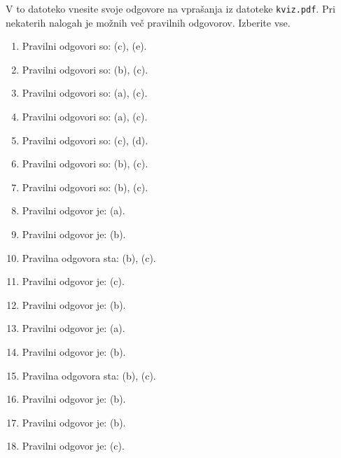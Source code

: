\documentclass[11pt]{article}
\begin{document}
V to datoteko vnesite svoje odgovore na vprašanja iz datoteke
\texttt{kviz.pdf}.
Pri nekaterih nalogah je možnih več pravilnih odgovorov.
Izberite vse.

\begin{enumerate}

    \item Pravilni odgovori so: (c), (e).

    \item Pravilni odgovori so: (b), (c).

    \item Pravilni odgovori so: (a), (c).

    \item Pravilni odgovori so: (a), (c).

    \item Pravilni odgovori so: (c), (d).

    \item Pravilni odgovori so: (b), (c).

    \item Pravilni odgovori so: (b), (c).

    \item Pravilni odgovor je: (a).

    \item Pravilni odgovor je: (b).

    \item Pravilna odgovora sta: (b), (c).

    \item Pravilni odgovor je: (c).

    \item Pravilni odgovor je: (b).

    \item Pravilni odgovor je: (a).

    \item Pravilni odgovor je: (b).

    \item Pravilna odgovora sta: (b), (c).

    \item Pravilni odgovor je: (b).

    \item Pravilni odgovor je: (b).

    \item Pravilni odgovor je: (c).

\end{enumerate}
\end{document}
